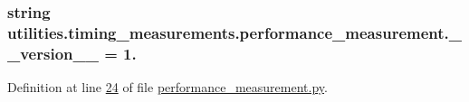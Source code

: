 \subsubsection[{\+\_\+\+\_\+version\+\_\+\+\_\+}]{\setlength{\rightskip}{0pt plus 5cm}string utilities.\+timing\+\_\+measurements.\+performance\+\_\+measurement.\+\_\+\+\_\+version\+\_\+\+\_\+ = \textquotesingle{}1.\textquotesingle{}}\label{namespaceutilities_1_1timing__measurements_1_1performance__measurement_acaa159634d0efe832d19c3272a52ee1f}


Definition at line \hyperlink{performance__measurement_8py_source_l00024}{24} of file \hyperlink{performance__measurement_8py_source}{performance\+\_\+measurement.\+py}.

